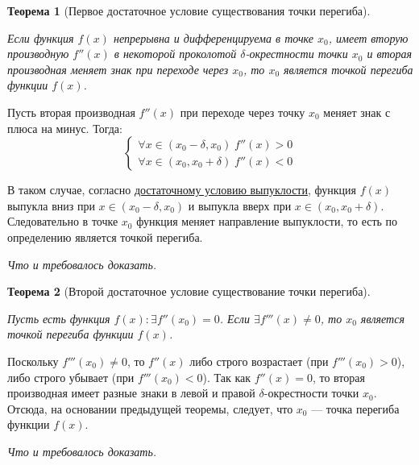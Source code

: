 \documentclass[a4paper,12pt,oneside]{extbook}
\newcommand{\newpar}{$ $\par\nobreak\ignorespaces}
\theoremstyle{numbered}
\theoremstyle{unnumbered}
\theoremstyle{named}
\newtheorem{theorem}{Теорема}[section]
\theoremstyle{unnumbered}
\theoremstyle{named}
\theoremstyle{named}
\theoremstyle{named}
\renewenvironment{proof}[1][]{\breakenv[Доказательство]{\if\relax\detokenize{#1}\relax\else\;\fi}{\textbf{#1}}}{\smallskip\newpar \hfill\textit{Что и требовалось доказать.}}
\newcommand{\plink}[2]{\hyperref[#1]{\color{blue}\underline{#2}}}
\begin{document}
\begin{theorem}[Первое достаточное условие существования точки перегиба]
    \newpar
    Если функция \(f(x)\) непрерывна и дифференцируема в точке \(x_0\), имеет вторую производную \(f''(x)\) в некоторой проколотой \(\delta\)-окрестности точки \(x_0\) и вторая производная меняет знак при переходе через \(x_0\), то \(x_0\) является точкой перегиба функции \(f(x)\).
\end{theorem}

\begin{proof}
    Пусть вторая производная \(f''(x)\) при переходе через точку \(x_0\) меняет знак с плюса на минус. Тогда:
    \[
        \begin{cases}
            \forall x \in (x_0 - \delta, x_0) \; f''(x) > 0 \\
            \forall x \in (x_0, x_0 + \delta) \; f''(x) < 0
        \end{cases}
    \]

    В таком случае, согласно \plink{theorem:Достаточное условие вогнутости или выпуклости графика}{достаточному условию выпуклости}, функция \(f(x)\) выпукла вниз при \(x \in (x_0 - \delta, x_0)\) и выпукла вверх при \(x \in (x_0, x_0 + \delta)\). Следовательно в точке \(x_0\) функция меняет направление выпуклости, то есть по определению является точкой перегиба.
\end{proof}

\begin{theorem}[Второй достаточное условие существование точки перегиба]
    \newpar
    Пусть есть функция \(f(x): \exists f''(x_0) = 0\). Если \(\exists f'''(x) \neq 0\), то \(x_0\) является точкой перегиба функции \(f(x)\).
\end{theorem}

\begin{proof}
    Поскольку \(f'''(x_0) \neq 0\), то \(f''(x)\) либо строго возрастает (при \(f'''(x_0) > 0\)), либо строго убывает (при \(f'''(x_0) < 0\)). Так как \(f''(x) = 0\), то вторая производная имеет разные знаки в левой и правой \(\delta\)-окрестности точки \(x_0\). Отсюда, на основании предыдущей теоремы, следует, что \(x_0\) — точка перегиба функции \(f(x)\).
\end{proof}
\end{document}
